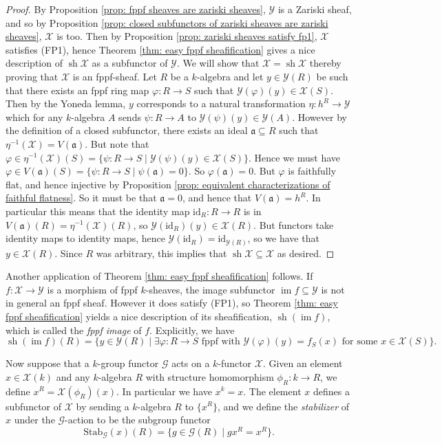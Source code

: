 \documentclass[oneside,11pt]{amsart}
\newcommand{\mX}{\ensuremath{\mathcal{X}}}
\newcommand{\mY}{\ensuremath{\mathcal{Y}}}
\newcommand{\mG}{\ensuremath{\mathcal{G}}}
\newcommand{\fa}{\ensuremath{\mathfrak{a}}}
\newcommand{\id}{\ensuremath{\text{id}}}
\newcommand{\Stab}{\ensuremath{\text{Stab}}}
\newcommand{\im}{\operatorname{im}}
\newcommand{\sh}{\operatorname{sh}}
\theoremstyle{definition}
\newtheorem{proof techniques}{Proof Techniques}
\begin{document}
\begin{proof}
By Proposition \ref{prop: fppf sheaves are zariski sheaves}, $\mY$ is a Zariski sheaf, and so by Proposition \ref{prop: closed subfunctors of zariski sheaves are zariski sheaves}, $\mX$ is too. Then by Proposition \ref{prop: zariski sheaves satisfy fp1}, $\mX$ satisfies (FP1), hence Theorem \ref{thm: easy fppf sheafification} gives a nice description of $\sh \mX$ as a subfunctor of $\mY$. We will show that $\mX = \sh \mX$ thereby proving that $\mX$ is an fppf-sheaf. Let $R$ be a $k$-algebra and let $y \in \mY(R)$ be such that there exists an fppf ring map $\varphi : R \to S$ such that $\mY(\varphi)(y) \in \mX(S)$. Then by the Yoneda lemma, $y$ corresponds to a natural transformation $\eta : h^R \to \mY$ which for any $k$-algebra $A$ sends $\psi : R \to A$ to $\mY(\psi)(y) \in \mY(A)$. However by the definition of a closed subfunctor, there exists an ideal $\fa \subseteq R$ such that $\eta^{-1}(\mX) = V(\fa)$. But note that $\varphi \in \eta^{-1}(\mX)(S) = \{ \psi : R \to S \mid \mY(\psi)(y) \in \mX(S) \}$. Hence we must have $\varphi \in V(\fa)(S) = \{ \psi : R \to S \mid \psi(\fa) = 0 \}$. So $\varphi(\fa) = 0$. But $\varphi$ is faithfully flat, and hence injective by Proposition \ref{prop: equivalent characterizations of faithful flatness}. So it must be that $\fa = 0$, and hence that $V(\fa) = h^R$. In particular this means that the identity map $\id_R : R \to R$ is in $V(\fa)(R) = \eta^{-1}(\mX)(R)$, so $\mY(\id_R)(y) \in \mX(R)$. But functors take identity maps to identity maps, hence $\mY(\id_R) = \id_{\mY(R)}$, so we have that $y \in \mX(R)$. Since $R$ was arbitrary, this implies that $\sh \mX \subseteq \mX$ as desired. 
\end{proof}

Another application of Theorem \ref{thm: easy fppf sheafification} follows. If $f : \mX \to \mY$ is a morphism of fppf $k$-sheaves, the image subfunctor $\im f \subseteq \mY$ is not in general an fppf sheaf. However it does satisfy (FP1), so Theorem \ref{thm: easy fppf sheafification} yields a nice description of its sheafification, $\sh( \im f)$, which is called the \emph{fppf image} of $f$. Explicitly, we have
\begin{equation}\label{eq: fppf-image description}
\sh( \im f)(R) = \{ y \in \mY(R) \mid \exists \varphi: R \to S \text{ fppf with } \mY(\varphi)(y) = f_S(x) \text{ for some } x \in \mX(S) \}.
\end{equation}

Now suppose that a $k$-group functor $\mG$ acts on a $k$-functor $\mX$. Given an element $x \in \mX(k)$ and any $k$-algebra $R$ with structure homomorphism $\phi_R : k \to R$, we define $x^R = \mX(\phi_R)(x)$. In particular we have $x^k = x$. The element $x$ defines a subfunctor of $\mX$ by sending a $k$-algebra $R$ to $\{ x^R \}$, and we define the \emph{stabilizer} of $x$ under the $\mG$-action to be the subgroup functor 
\begin{equation*}
\Stab_\mG(x)(R) =\{ g \in \mG(R) \mid g x^R = x^R  \}.
\end{equation*} 
\end{document}
